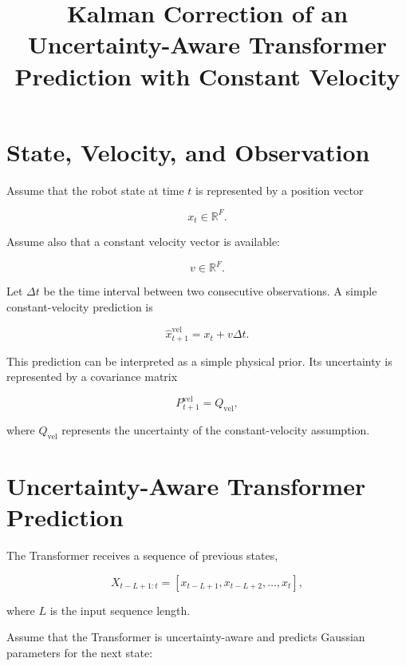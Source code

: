 \documentclass[a4paper]{article}
\title{Kalman Correction of an Uncertainty-Aware Transformer Prediction with Constant Velocity}
\date{}
\begin{document}
    \maketitle
    
    
    \section{State, Velocity, and Observation}
        
        Assume that the robot state at time \(t\) is represented by a position vector
        
        \[
            x_t
            \in
            \mathbb{R}^{F}.
        \]
        
        Assume also that a constant velocity vector is available:
        
        \[
            v
            \in
            \mathbb{R}^{F}.
        \]
        
        Let \(\Delta t\) be the time interval between two consecutive observations. A simple constant-velocity prediction is
        
        \[
            \hat{x}_{t+1}^{\mathrm{vel}}
            =
            x_t
            +
            v\Delta t.
        \]
        
        This prediction can be interpreted as a simple physical prior. Its uncertainty is represented by a covariance matrix
        
        \[
            P_{t+1}^{\mathrm{vel}}
            =
            Q_{\mathrm{vel}},
        \]
        
        where \(Q_{\mathrm{vel}}\) represents the uncertainty of the constant-velocity assumption.
    
    
    \section{Uncertainty-Aware Transformer Prediction}
        
        The Transformer receives a sequence of previous states,
        
        \[
            X_{t-L+1:t}
            =
            \left[
                x_{t-L+1},
            x_{t-L+2},
                \ldots,
            x_t
            \right],
        \]
        
        where \(L\) is the input sequence length.
        
        Assume that the Transformer is uncertainty-aware and predicts Gaussian parameters for the next state:
        
\end{document}
